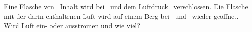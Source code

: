 Eine Flasche von \VFO\ Inhalt wird bei \thEiO\ und dem Luftdruck \pEiO\ verschlossen. Die Flasche mit der darin enthaltenen Luft wird auf einem Berg bei \thZwO\ und \pZwO\ wieder geöffnet. Wird Luft ein- oder ausströmen und wie viel?
